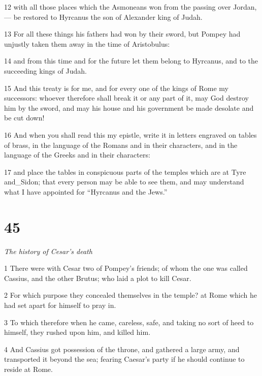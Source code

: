 \par 12 with all those places which the Asmoneans won from the passing over Jordan,— be restored to Hyrcanus the son of Alexander king of Judah. 

\par 13 For all these things his fathers had won by their sword, but Pompey had unjustly taken them away in the time of Aristobulus: 

\par 14 and from this time and for the future let them belong to Hyrcanus, and to the succeeding kings of Judah. 

\par 15 And this treaty is for me, and for every one of the kings of Rome my successors: whoever therefore shall break it or any part of it, may God destroy him by the sword, and may his house and his government be made desolate and be cut down! 

\par 16 And when you shall read this my epistle, write it in letters engraved on tables of brass, in the language of the Romans and in their characters, and in the language of the Greeks and in their characters: 

\par 17 and place the tables in conspicuous parts of the temples which are at Tyre and_Sidon; that every person may be able to see them, and may understand what I have appointed for “Hyrcanus and the Jews.” 

\chapter{45}

\par \textit{The history of Cesar’s death}

\par 1 There were with Cesar two of Pompey’s friends; of whom the one was called Cassius, and the other Brutus; who laid a plot to kill Cesar. 

\par 2 For which purpose they concealed themselves in the temple? at Rome which he had set apart for himself to pray in. 

\par 3 To which therefore when he came, careless, safe, and taking no sort of heed to himself, they rushed upon him, and killed him. 

\par 4 And Cassius got possession of the throne, and gathered a large army, and transported it beyond the sea; fearing Caesar’s party if he should continue to reside at Rome. 


